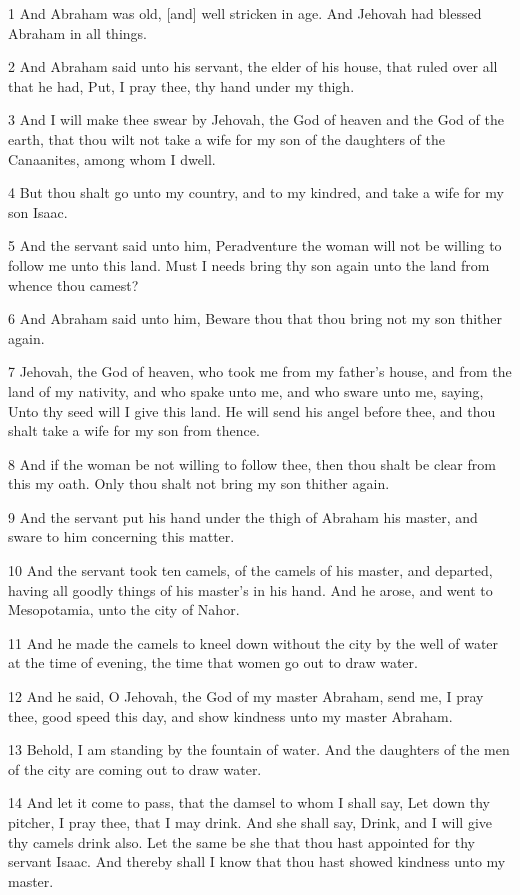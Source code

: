 \par 1 And Abraham was old, [and] well stricken in age. And Jehovah had blessed Abraham in all things.
\par 2 And Abraham said unto his servant, the elder of his house, that ruled over all that he had, Put, I pray thee, thy hand under my thigh.
\par 3 And I will make thee swear by Jehovah, the God of heaven and the God of the earth, that thou wilt not take a wife for my son of the daughters of the Canaanites, among whom I dwell.
\par 4 But thou shalt go unto my country, and to my kindred, and take a wife for my son Isaac.
\par 5 And the servant said unto him, Peradventure the woman will not be willing to follow me unto this land. Must I needs bring thy son again unto the land from whence thou camest?
\par 6 And Abraham said unto him, Beware thou that thou bring not my son thither again.
\par 7 Jehovah, the God of heaven, who took me from my father's house, and from the land of my nativity, and who spake unto me, and who sware unto me, saying, Unto thy seed will I give this land. He will send his angel before thee, and thou shalt take a wife for my son from thence.
\par 8 And if the woman be not willing to follow thee, then thou shalt be clear from this my oath. Only thou shalt not bring my son thither again.
\par 9 And the servant put his hand under the thigh of Abraham his master, and sware to him concerning this matter.
\par 10 And the servant took ten camels, of the camels of his master, and departed, having all goodly things of his master's in his hand. And he arose, and went to Mesopotamia, unto the city of Nahor.
\par 11 And he made the camels to kneel down without the city by the well of water at the time of evening, the time that women go out to draw water.
\par 12 And he said, O Jehovah, the God of my master Abraham, send me, I pray thee, good speed this day, and show kindness unto my master Abraham.
\par 13 Behold, I am standing by the fountain of water. And the daughters of the men of the city are coming out to draw water.
\par 14 And let it come to pass, that the damsel to whom I shall say, Let down thy pitcher, I pray thee, that I may drink. And she shall say, Drink, and I will give thy camels drink also. Let the same be she that thou hast appointed for thy servant Isaac. And thereby shall I know that thou hast showed kindness unto my master.
